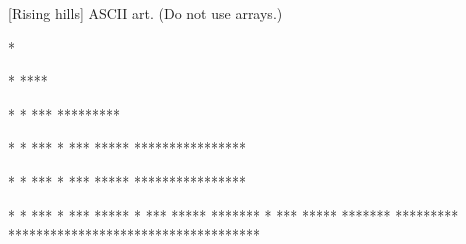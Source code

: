 [Rising hills]
ASCII art.
(Do not use arrays.)
\begin{console}[commandchars=\\\{\}]
*
\end{console}
\begin{console}[commandchars=\\\{\}]
  *
****
\end{console}
\begin{console}[commandchars=\\\{\}]
      *
  *  ***
*********
\end{console}
\begin{console}[commandchars=\\\{\}]
            *
      *    ***
  *  ***  *****
****************
\end{console}

\begin{console}[commandchars=\\\{\}]
            *
      *    ***
  *  ***  *****
****************
\end{console}
\begin{console}[commandchars=\\\{\}]
                              *     
                    *        ***    
            *      ***      *****   
      *    ***    *****    *******  
  *  ***  *****  *******  ********* 
************************************
\end{console}

